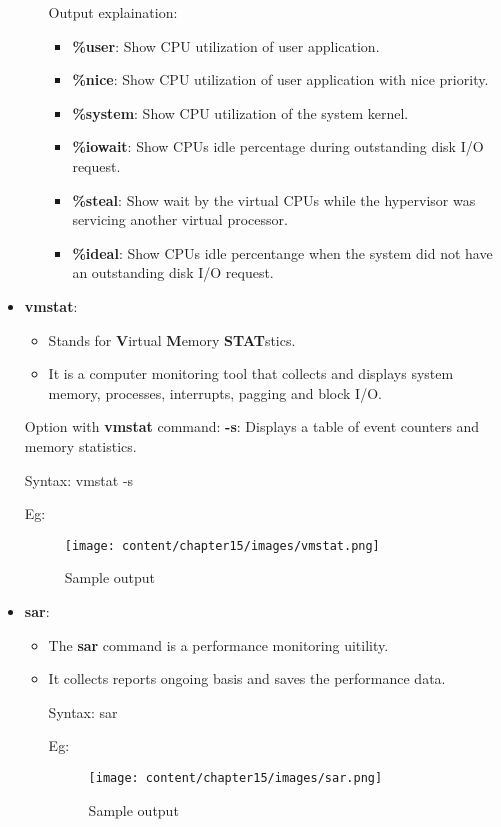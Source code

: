 \begin{flushleft}
\begin{itemize}
\begin{itemize}
		Output explaination:
		\begin{itemize}
			\item \textbf{\%user}: Show CPU utilization of user application.
			\item \textbf{\%nice}: Show CPU utilization of user application with nice priority.
			\item \textbf{\%system}: Show CPU utilization of the system kernel.
			\item \textbf{\%iowait}: Show CPUs idle percentage during outstanding disk I/O request.
			\item \textbf{\%steal}: Show wait by the virtual CPUs while the hypervisor was servicing another virtual processor.
			\item \textbf{\%ideal}: Show CPUs idle percentange when the	system did not have an outstanding disk I/O request.
		\end{itemize}
	\end{itemize}
	\newpage
	\item \textbf{vmstat}: 
	\begin{itemize}
		\item Stands for \textbf{V}irtual \textbf{M}emory \textbf{STAT}stics.
		\item It is a computer monitoring tool that collects and displays system memory, processes, interrupts, pagging and block I/O.
	\end{itemize}
	\bigskip
	Option with \textbf{vmstat} command:
	\newline
	\textbf{-s}: Displays a table of event counters and memory statistics.
	\newline
	\begin{tcolorbox}[breakable,notitle,boxrule=0pt,colback=pink,colframe=pink]
		\color{black}
		\font=9pt
		Syntax: vmstat -s
		\font=4pt
	\end{tcolorbox}
	Eg:
	\begin{figure}[h!]
		\centering
		\texttt{[image: content/chapter15/images/vmstat.png]}
		\caption{Sample output}
		\label{fig:output3}
	\end{figure}
	
	\newpage
	\item \textbf{sar}: 
	\begin{itemize}
		\item The \textbf{sar} command is a performance monitoring uitility.
		\item It collects reports ongoing basis and saves the performance data.
		\begin{tcolorbox}[breakable,notitle,boxrule=0pt,colback=pink,colframe=pink]
			\color{black}
			\font=9pt
			Syntax: sar
			\font=4pt
		\end{tcolorbox}
		Eg:
		\begin{figure}[h!]
			\centering
			\texttt{[image: content/chapter15/images/sar.png]}
			\caption{Sample output}
			\label{fig:output4}
		\end{figure}
		

\end{itemize}
\end{itemize}
\end{flushleft}
